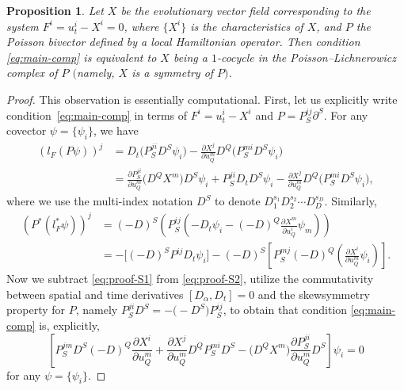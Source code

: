 \documentclass[10pt,a4paper]{amsart}
\numberwithin{equation}{section}
\newtheorem{Proposition}[Theorem]{Proposition}
 { \theoremstyle{definition}
\newtheorem{Definition}[Theorem]{Definition}
\newtheorem{Note}[Theorem]{Note}
\newtheorem{Example}[Theorem]{Example}
\newtheorem{Remark}[Theorem]{Remark} }
\begin{document}
\begin{Proposition}
Let $X$ be the evolutionary vector field corresponding to the system $F^i=u^i_t-X^i=0$, where $\{X^i\}$ is the characteristics of $X$, and $P$ the Poisson bivector defined by a local Hamiltonian operator. Then condition \eqref{eq:main-comp} is equivalent to $X$ being a $1$-cocycle in the Poisson--Lichnerowicz complex of $P$ $($namely, $X$ is a symmetry of $P)$.
\end{Proposition}
\begin{proof}
This observation is essentially computational. First, let us explicitly write condition~\eqref{eq:main-comp} in terms of $F^i=u^i_t-X^i$ and $P=P^{ij}_S\partial^S$. For any covector $\psi=\{\psi_i\}$, we have
\begin{align}
(l_F(P\psi))^j&=D_t\big(P^{ji}_SD^S\psi_i\big)-\frac{\partial X^j}{\partial u^m_Q}D^Q\big(P^{mi}_SD^S\psi_i\big)\nonumber\\
&=\frac{\partial P^{ji}_S}{\partial u^m_Q}\big(D^Q X^m\big)D^S\psi_i+P^{ji}_SD_tD^S\psi_i-\frac{\partial X^j}{\partial u^m_Q}D^Q\big(P^{mi}_SD^S\psi_i\big),\label{eq:proof-S1}
\end{align}
where we use the multi-index notation $D^S$ to denote $D_1^{s_1}D_2^{s_2}\cdots D^{s_D}_{D}$.
Similarly,
\begin{align}
(P^*(l_F^*\psi))^j&=(-D)^S\left(P^{ij}_S\left(-D_t\psi_i-(-D)^Q\frac{\partial X^m}{\partial u^i_Q}\psi_m\right)\right)\nonumber\\
&=-\big[(-D)^SP^{ij}D_t\psi_i\big]-(-D)^S\left[ P^{mj}_S(-D)^Q\left(\frac{\partial X^i}{\partial u^m_Q}\psi_i\right)\right].\label{eq:proof-S2}
\end{align}
Now we subtract \eqref{eq:proof-S1} from \eqref{eq:proof-S2}, utilize the commutativity between spatial and time derivatives $[D_\alpha,D_t]=0$ and the skewsymmetry property for $P$, namely $P^{ji}_SD^S=-\bigl(-D^S\bigr)P^{ij}_S$, to obtain that condition \eqref{eq:main-comp} is, explicitly,
\begin{equation}\label{eq:proof-comp}
\left[P^{jm}_SD^S(-D)^Q\frac{\partial X^i}{\partial u^m_Q}+\frac{\partial X^j}{\partial u^m_Q}D^QP^{mi}_SD^S-\big(D^QX^m\big)\frac{\partial P^{ji}_S}{\partial u^m_Q}D^S\right]\psi_i=0
\end{equation}
for any $\psi=\{\psi_i\}$.


\end{proof}
\end{document}
